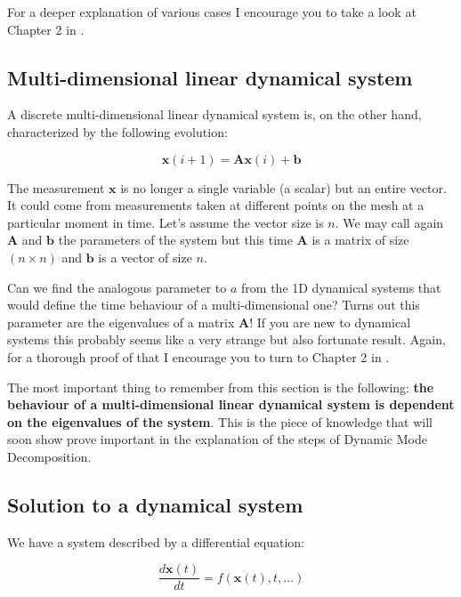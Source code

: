 \documentclass[10pt,twocolumn]{article}
\begin{document}
For a deeper explanation of various cases I encourage you to take a look at Chapter 2 in \cite{Prof_Edward_Scheinerman}.

\subsection{Multi-dimensional linear dynamical system}

A discrete multi-dimensional linear dynamical system is, on the other hand, characterized by the following evolution:

\begin{equation}
\mathbf{x}(i+1) = \mathbf{A} \mathbf{x}(i) + \mathbf{b}
\end{equation}

The measurement $\mathbf{x}$ is no longer a single variable (a scalar) but an entire vector. It could come from measurements taken at different points on the mesh at a particular moment in time. Let's assume the vector size is $n$. We may call again $\mathbf{A}$ and $\mathbf{b}$ the parameters of the system but this time $\mathbf{A}$ is a matrix of size $(n \times n)$ and $\mathbf{b}$ is a vector of size $n$.

Can we find the analogous parameter to $a$ from the 1D dynamical systems that would define the time behaviour of a multi-dimensional one? Turns out this parameter are the eigenvalues of a matrix $\mathbf{A}$! If you are new to dynamical systems this probably seems like a very strange but also fortunate result. Again, for a thorough proof of that I encourage you to turn to Chapter 2 in \cite{Prof_Edward_Scheinerman}.

The most important thing to remember from this section is the following: \textbf{the behaviour of a multi-dimensional linear dynamical system is dependent on the eigenvalues of the system}. This is the piece of knowledge that will soon show prove important in the explanation of the steps of Dynamic Mode Decomposition.

\subsection{Solution to a dynamical system}

We have a system described by a differential equation:

\begin{equation} \label{eq:system_DE}
\frac{d \mathbf{x}(t)}{dt} = f(\mathbf{x}(t), t, \dots)
\end{equation}
\end{document}

